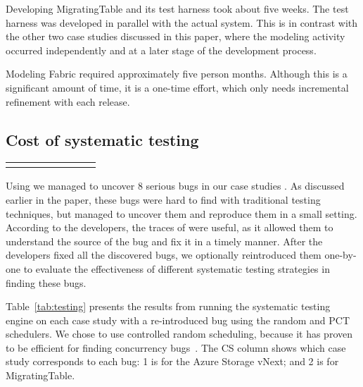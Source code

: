 Developing MigratingTable and its \psharp test harness took about five weeks. The test harness was developed in parallel with the actual system. This is in contrast with the other two case studies discussed in this paper, where the modeling activity occurred independently and at a later stage of the development process.

Modeling Fabric required approximately five person months. Although this is a significant amount of time, it is a one-time effort, which only needs incremental refinement with each release.

\subsection{Cost of systematic testing}
\label{sec:eval:machine_cost}

\setlength{\tabcolsep}{.72em}
\begin{table*}[t]
\small
\centering
\begin{tabular}{rl rrr rrr}
\centering

\end{tabular}
\caption{Results from running the \psharp random and PCT systematic testing schedulers for 100,000 iterations. We report: time in seconds to find a bug (Time to Bug); number of scheduling steps when a bug was found (\#SS); and if a bug was found with a particular scheduler (BF?).}
\label{tab:testing}
\end{table*}

Using \psharp we managed to uncover 8 serious bugs in our case studies . As discussed earlier in the paper, these bugs were hard to find with traditional testing techniques, but \psharp managed to uncover them and reproduce them in a small setting. According to the developers, the traces of \psharp were useful, as it allowed them to understand the source of the bug and fix it in a timely manner. After the developers fixed all the discovered bugs, we optionally reintroduced them one-by-one to evaluate the effectiveness of different \psharp systematic testing strategies in finding these bugs.

Table~\ref{tab:testing} presents the results from running the \psharp systematic testing engine on each case study with a re-introduced bug using the random and PCT schedulers. We chose to use controlled random scheduling, because it has proven to be efficient for finding concurrency bugs~\cite{thomson2014sct, deligiannis2015psharp}. The CS column shows which case study corresponds to each bug: 1 is for the Azure Storage vNext; and 2 is for MigratingTable. 

